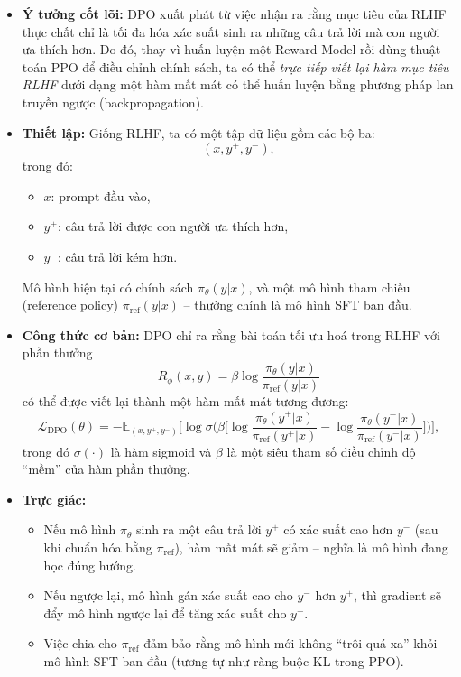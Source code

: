 \begin{itemize}
    \item \textbf{Ý tưởng cốt lõi:}  
    DPO xuất phát từ việc nhận ra rằng mục tiêu của RLHF thực chất chỉ là tối đa hóa xác suất sinh ra những câu trả lời mà con người ưa thích hơn.  
    Do đó, thay vì huấn luyện một Reward Model rồi dùng thuật toán PPO để điều chỉnh chính sách, ta có thể \emph{trực tiếp viết lại hàm mục tiêu RLHF} dưới dạng một hàm mất mát có thể huấn luyện bằng phương pháp lan truyền ngược (backpropagation).

    \item \textbf{Thiết lập:}  
    Giống RLHF, ta có một tập dữ liệu gồm các bộ ba:
    \[
        (x, y^+, y^-),
    \]
    trong đó:
    \begin{itemize}
        \item $x$: prompt đầu vào,
        \item $y^+$: câu trả lời được con người ưa thích hơn,
        \item $y^-$: câu trả lời kém hơn.
    \end{itemize}
    Mô hình hiện tại có chính sách $\pi_{\theta}(y|x)$, và một mô hình tham chiếu (reference policy) $\pi_{\text{ref}}(y|x)$ – thường chính là mô hình SFT ban đầu.

    \item \textbf{Công thức cơ bản:}
    DPO chỉ ra rằng bài toán tối ưu hoá trong RLHF với phần thưởng
    \[
        R_{\phi}(x,y) = \beta \log \frac{\pi_{\theta}(y|x)}{\pi_{\text{ref}}(y|x)}
    \]
    có thể được viết lại thành một hàm mất mát tương đương:
    \[
        \mathcal{L}_{\text{DPO}}(\theta)
        = -\mathbb{E}_{(x, y^+, y^-)} 
        \Big[
            \log \sigma\big(
                \beta \big[
                    \log \frac{\pi_{\theta}(y^+|x)}{\pi_{\text{ref}}(y^+|x)}
                    -
                    \log \frac{\pi_{\theta}(y^-|x)}{\pi_{\text{ref}}(y^-|x)}
                \big]
            \big)
        \Big],
    \]
    trong đó $\sigma(\cdot)$ là hàm sigmoid và $\beta$ là một siêu tham số điều chỉnh độ “mềm” của hàm phần thưởng.

    \item \textbf{Trực giác:}
    \begin{itemize}
        \item Nếu mô hình $\pi_{\theta}$ sinh ra một câu trả lời $y^+$ có xác suất cao hơn $y^-$ (sau khi chuẩn hóa bằng $\pi_{\text{ref}}$), hàm mất mát sẽ giảm – nghĩa là mô hình đang học đúng hướng.
        \item Nếu ngược lại, mô hình gán xác suất cao cho $y^-$ hơn $y^+$, thì gradient sẽ đẩy mô hình ngược lại để tăng xác suất cho $y^+$.
        \item Việc chia cho $\pi_{\text{ref}}$ đảm bảo rằng mô hình mới không “trôi quá xa” khỏi mô hình SFT ban đầu (tương tự như ràng buộc KL trong PPO).
    \end{itemize}


\end{itemize}
